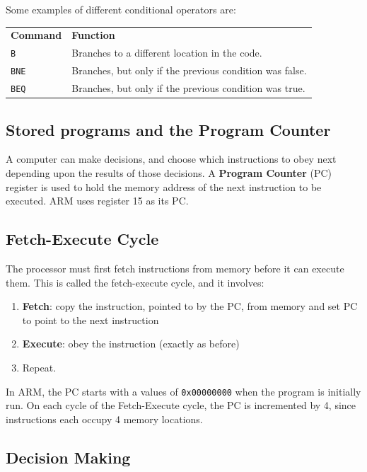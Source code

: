 Some examples of different conditional operators are:

\begin{tabularx}{\textwidth}{l X}
	{\bf Command} & {\bf Function}\\
	\texttt{B} & Branches to a different location in the code.\\
	\texttt{BNE} & Branches, but only if the previous condition was false.\\
	\texttt{BEQ} & Branches, but only if the previous condition was true.\\
\end{tabularx}

\subsection{Stored programs and the Program Counter}
\label{subsec:pc}

A computer can make decisions, and choose which instructions to obey next
depending upon the results of those decisions. A {\bf Program Counter} (PC)
register is used to hold the memory address of the next instruction to be
executed. ARM uses register 15 as its PC.

\subsection{Fetch-Execute Cycle}

The processor must first fetch instructions from memory before it can execute
them. This is called the fetch-execute cycle, and it involves:

\begin{enumerate}     \item \textbf{Fetch}: copy the instruction, pointed to by
the PC, from memory and set PC to point to the next instruction     \item
\textbf{Execute}:  obey the instruction (exactly as before)     \item Repeat.
\end{enumerate}

In ARM, the PC starts with a values of \texttt{0x00000000} when the program is
initially run. On each cycle of the Fetch-Execute cycle, the PC is incremented
by 4, since instructions each occupy 4 memory locations.

\subsection{Decision Making}


